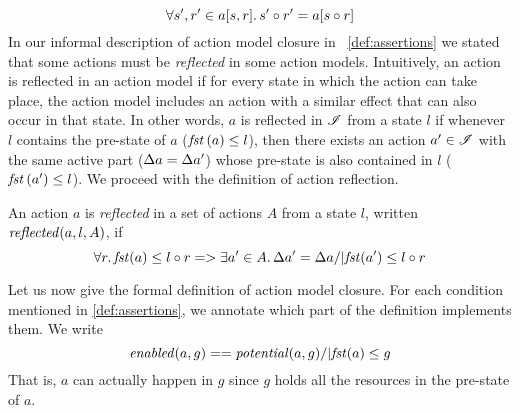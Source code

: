 %
\[
	\forall s', r' \in a[s, r] .\, s' \circ r' = a[s\circ r]
\]
%
In our informal description of action model closure in ~\ref{def:assertions} we stated that some actions must be \emph{reflected} in some action models. 
Intuitively, an action is reflected in an action model if for every state in which the action can take place, the action model includes an action with a similar effect that can also occur in that state. In other words, $a$ is reflected in $\mathscr{I}$ from a state $l$ if whenever $l$ contains the pre-state of $a$ ($\mathit{fst}\left(a\right) \leq l$), then there exists an action $a' \in \mathscr{I}$ with the same active part ($\Delta {a} = \Delta {a'}$) whose pre-state is also contained in $l$ ($\mathit{fst}\left(a'\right) \leq l$).
We proceed with the definition of action reflection.
%
%
\begin{definition}
An action $a$ is \emph{reflected} in a set of actions $A$ from a state $l$, written $\mathit{reflected}(a,l,A)$, if
%
\[
  \forall r.\, \mathit{fst}(a)\leq l\circ r =>
  \exists a'\in A.\, \Delta {a'} = \Delta {a} /| \mathit{fst}(a')\leq l\circ r
\]
\end{definition}
%
%
Let us now give the formal definition of action model closure. For each condition mentioned in \ref{def:assertions}, we annotate which part of the definition implements them. We write
%
\[
\mathit{enabled}(a,g) == \mathit{potential}(a,g) /| \mathit{fst}(a)\leq g
\]
%
That is, $a$ can actually happen in $g$ since $g$ holds all the resources in the pre-state of $a$.
%
%
